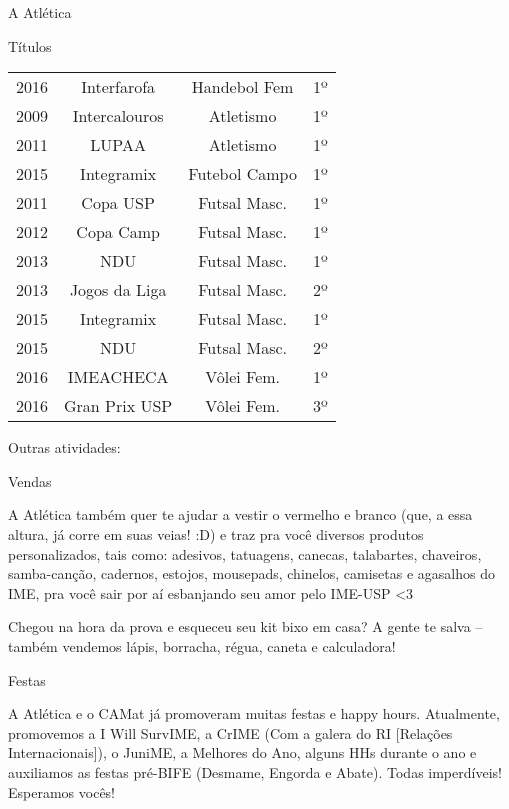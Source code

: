 \begin{secao}{A Atlética}
\begin{subsecao}{Títulos}
\begin{center}
\begin{tabular}{c|c|c|c}
    2016 & Interfarofa    & Handebol Fem    & 1º\\
    2009 & Intercalouros  & Atletismo       & 1º\\
    2011 & LUPAA          & Atletismo       & 1º\\
    2015 & Integramix     & Futebol Campo   & 1º\\
    2011 & Copa USP       & Futsal Masc.    & 1º\\
    2012 & Copa Camp      & Futsal Masc.    & 1º\\
    2013 & NDU            & Futsal Masc.    & 1º\\
    2013 & Jogos da Liga  & Futsal Masc.    & 2º\\
    2015 & Integramix     & Futsal Masc.    & 1º\\
    2015 & NDU            & Futsal Masc.    & 2º\\
    2016 & IMEACHECA      & Vôlei Fem.      & 1º\\
    2016 & Gran Prix USP  & Vôlei Fem.      & 3º
  \end{tabular}
\end{center}

\end{subsecao}
Outras atividades:

\begin{subsecao}{Vendas}

A Atlética também quer te ajudar a vestir o vermelho e branco (que, a essa
altura, já corre em suas veias! :D) e traz pra você diversos produtos
personalizados, tais como: adesivos, tatuagens, canecas, talabartes, chaveiros,
samba-canção, cadernos, estojos, mousepads, chinelos, camisetas e agasalhos do
IME, pra você sair por aí esbanjando seu amor pelo IME-USP <3

Chegou na hora da prova e esqueceu seu kit bixo em casa? A gente te salva --
também vendemos lápis, borracha, régua, caneta e calculadora!

\end{subsecao}
\begin{subsecao}{Festas}

A Atlética e o CAMat já promoveram muitas festas e happy hours. Atualmente,
promovemos a I Will SurvIME, a CrIME (Com a galera do RI [Relações
Internacionais]), o JuniME, a Melhores do Ano, alguns HHs durante o ano e
auxiliamos as festas pré-BIFE (Desmame, Engorda e Abate). Todas imperdíveis!
Esperamos vocês!


\end{subsecao}
\end{secao}
